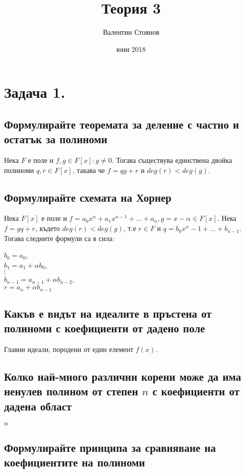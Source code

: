 \documentclass[10pt]{article}
\begin{document}
\title{Теория 3}
\author{Валентин Стоянов}
\date{юни 2018}
\maketitle

\section*{Задача 1.}

\subsection*{Формулирайте теоремата за деление с частно и остатък за полиноми}
Нека $F$ е поле и $f, g \in F[x]: g \neq 0$. Тогава съществува единствена двойка полиноми $q, r \in F[x]$, такава че $f = qg + r$ и $deg(r) < deg(g)$.

\subsection*{Формулирайте схемата на Хорнер}
Нека $F[x]$ е поле и $f = a_0x^n + a_1x^{n-1} + \ldots + a_n, g = x - \alpha \in F[x]$. Нека $f = gq + r$, където $deg(r) < deg(g)$, т.е $r \in F$ и $q = b_0x^n-1+ \ldots + b_{n-1}$. Тогава следните формули са в сила:
\begin{center}
	$b_0 = a_0$,\\
	$b_1 = a_1 + \alpha b_0$,\\
	$\vdots$\\
	$b_{n-1} = a_{n-1} + \alpha b_{n-2}$,\\
	$r = a_n + \alpha b_{n-1}$
\end{center}

\subsection*{Какъв е видът на идеалите в пръстена от полиноми с коефициенти от дадено поле}
Главни идеали, породени от един елемент $f(x)$.

\subsection*{Колко най-много различни корени може да има ненулев полином от степен $n$ с коефициенти от дадена област}
$n$
\subsection*{Формулирайте принципа за сравняване на коефициентите на полиноми}
\end{document}
